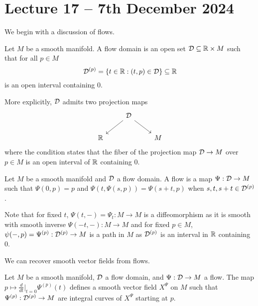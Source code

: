 \section{Lecture 17 -- 7th December 2024}\label{sec: lecture 17}
We begin with a discussion of flows. 
\begin{definition}\label{def: flow domain}
    Let $M$ be a smooth manifold. A flow domain is an open set $\mathcal{D}\subseteq\mathbb{R}\times M$ such that for all $p\in M$
    $$\mathcal{D}^{(p)}=\{t\in\mathbb{R}:(t,p)\in\mathcal{D}\}\subseteq\mathbb{R}$$
    is an open interval containing $0$. 
\end{definition}
More explicitly, $\mathcal{D}$ admits two projection maps 
$$%
\begin{tikzcd}
	& \Dcal \\
	\RR && M
	\arrow[from=1-2, to=2-1]
	\arrow[from=1-2, to=2-3]
\end{tikzcd}$$
where the condition states that the fiber of the projection map $\mathcal{D}\to M$ over $p\in M$ is an open interval of $\mathbb{R}$ containing 0. 
\begin{definition}[Flow]\label{def: flow}
    Let $M$ be a smooth manifold and $\mathcal{D}$ a flow domain. A flow is a map $\Psi:\mathcal{D}\to M$ such that $\Psi(0,p)=p$ and $\Psi(t,\Psi(s,p))=\Psi(s+t,p)$ when $s,t,s+t\in\mathcal{D}^{(p)}$. 
\end{definition}
\begin{remark}
    Note that for fixed $t$, $\Psi(t,-)=\Psi_{t}:M\to M$ is a diffeomorphism as it is smooth with smooth inverse $\Psi(-t,-):M\to M$ and for fixed $p\in M$, $\psi(-,p)=\Psi^{(p)}:\mathcal{D}^{(p)}\to M$ is a path in $M$ as $\mathcal{D}^{(p)}$ is an interval in $\mathbb{R}$ containing 0. 
\end{remark}
We can recover smooth vector fields from flows. 
\begin{lemma}\label{lem: smooth vector field of a flow}
    Let $M$ be a smooth manifold, $\mathcal{D}$ a flow domain, and $\Psi:\mathcal{D}\to M$ a flow. The map $p\mapsto \frac{d}{dt}|_{t=0}\Psi^{(p)}(t)$ defines a smooth vector field $X^{\Psi}$ on $M$ such that $\Psi^{(p)}:\mathcal{D}^{(p)}\to M$ are integral curves of $X^{\Psi}$ starting at $p$.  
\end{lemma}
